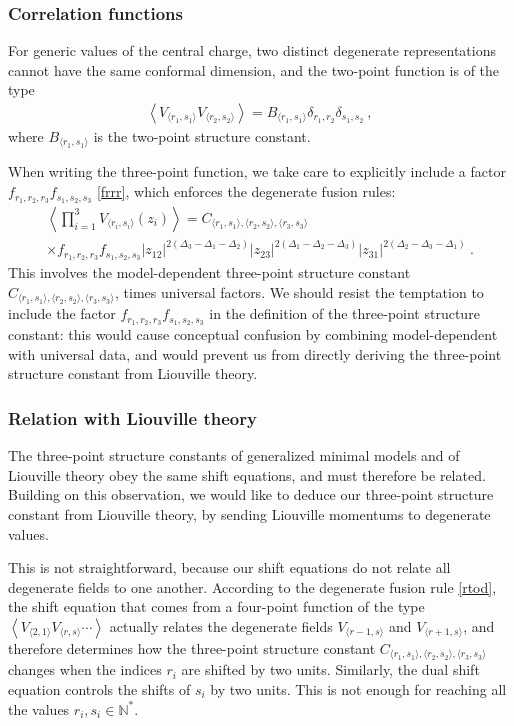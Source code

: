 \documentclass[12pt, a4paper, notitlepage, twoside]{report}
\numberwithin{equation}{section}
\theoremstyle{break}
\begin{document}
\subsubsection{Correlation functions}

For generic values of the central charge, two distinct degenerate representations cannot have the same conformal dimension, and the two-point function is of the type 
\begin{align}
 \left\langle V_{\langle r_1,s_1 \rangle} V_{\langle r_2,s_2 \rangle} \right\rangle = B_{\langle r_1,s_1 \rangle} \delta_{r_1,r_2} \delta_{s_1,s_2}\ ,
\label{vvdd}
\end{align}
where $B_{\langle r_1,s_1\rangle}$ is the two-point structure constant.

When writing the three-point function, we take care to explicitly include a factor $f_{r_1,r_2,r_3} f_{s_1,s_2,s_3}$ \eqref{frrr}, which enforces the degenerate fusion rules:
\begin{multline}
 \left\langle \prod_{i=1}^3 V_{\langle r_i,s_i \rangle}(z_i) \right\rangle = C_{\langle r_1,s_1\rangle ,\langle r_2,s_2\rangle ,\langle r_3,s_3 \rangle}  
\\ \times 
f_{r_1,r_2,r_3} f_{s_1,s_2,s_3} |z_{12}|^{2(\Delta_3-\Delta_1-\Delta_2)} |z_{23}|^{2(\Delta_1-\Delta_2-\Delta_3)} |z_{31}|^{2(\Delta_2-\Delta_3-\Delta_1)}\ .
\end{multline}
This involves the model-dependent three-point structure constant $C_{\langle r_1,s_1\rangle ,\langle r_2,s_2\rangle ,\langle r_3,s_3 \rangle}$, times universal factors. We should resist the temptation to include the factor $f_{r_1,r_2,r_3} f_{s_1,s_2,s_3}$ in the definition of the three-point structure constant: this would cause conceptual confusion by combining model-dependent with universal data, and would prevent us from directly deriving the three-point structure constant from Liouville theory.


\subsubsection{Relation with Liouville theory}

The three-point structure constants of generalized minimal models and of Liouville theory obey the same shift equations, and must therefore be related. Building on this observation, we would like to deduce our three-point structure constant from Liouville theory, by sending Liouville momentums to degenerate values. 

This is not straightforward, because our shift equations do not relate all degenerate fields to one another. According to the degenerate fusion rule \eqref{rtod}, the shift equation that comes from a four-point function of the type $\left< V_{\langle 2,1\rangle}V_{\langle r,s\rangle}\cdots \right>$ actually relates the degenerate fields $V_{\langle r-1,s\rangle}$ and $V_{\langle r+1,s\rangle}$, and therefore determines how the three-point structure constant $C_{\langle r_1,s_1\rangle ,\langle r_2,s_2\rangle ,\langle r_3,s_3 \rangle}$ changes when the indices $r_i$ are shifted by two units.
Similarly, the dual shift equation controls the shifts of $s_i$ by two units. This is not enough for reaching all the values $r_i,s_i\in \mathbb{N}^*$.
\end{document}
